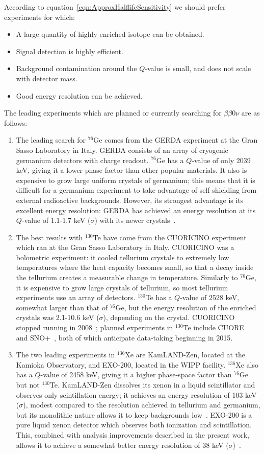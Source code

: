 According to equation~\ref{eqn:ApproxHalflifeSensitivity} we should prefer experiments for which:
\begin{itemize}
\item A large quantity of highly-enriched isotope can be obtained.
\item Signal detection is highly efficient.
\item Background contamination around the $Q$-value is small, and does not scale with detector mass.
\item Good energy resolution can be achieved.
\end{itemize}

The leading experiments which are planned or currently searching for $\beta\beta 0\nu$ are as follows:
\begin{enumerate}
\item The leading search for $^{76}$Ge comes from the GERDA experiment at the Gran Sasso Laboratory in Italy.  GERDA consists of an array of cryogenic germanium detectors with charge readout.  $^{76}$Ge has a $Q$-value of only 2039 keV, giving it a lower phase factor than other popular materials.  It also is expensive to grow large uniform crystals of germanium; this means that it is difficult for a germanium experiment to take advantage of self-shielding from external radioactive backgrounds.  However, its strongest advantage is its excellent energy resolution: GERDA has achieved an energy resolution at its $Q$-value of 1.1-1.7 keV ($\sigma$) with its newer crystals~\cite{PhysRevLett.111.122503}.
\item The best results with $^{130}$Te have come from the CUORICINO experiment which ran at the Gran Sasso Laboratory in Italy.  CUORICINO was a bolometric experiment: it cooled tellurium crystals to extremely low temperatures where the heat capacity becomes small, so that a decay inside the tellurium creates a measurable change in temperature.  Similarly to $^{76}$Ge, it is expensive to grow large crystals of tellurium, so most tellurium experiments use an array of detectors.  $^{130}$Te has a $Q$-value of 2528 keV, somewhat larger than that of $^{76}$Ge, but the energy resolution of the enriched crystals was 2.1-10.6 keV ($\sigma$), depending on the crystal.  CUORICINO stopped running in 2008~\cite{Andreotti2011822}; planned experiments in $^{130}$Te include CUORE~\cite{1402.0922} and SNO+~\cite{1402.1170}, both of which anticipate data-taking beginning in 2015.
\item The two leading experiments in $^{136}$Xe are KamLAND-Zen, located at the Kamioka Observatory, and EXO-200, located in the WIPP facility.  $^{136}$Xe also has a $Q$-value of 2458 keV, giving it a higher phase-space factor than $^{76}$Ge but not $^{130}$Te.  KamLAND-Zen dissolves its xenon in a liquid scintillator and observes only scintillation energy; it achieves an energy resolution of 103 keV ($\sigma$), modest compared to the resolution achieved in tellurium and germanium, but its monolithic nature allows it to keep backgrounds low~\cite{PhysRevLett.110.062502}.  EXO-200 is a pure liquid xenon detector which observes both ionization and scintillation. This, combined with analysis improvements described in the present work, allows it to achieve a somewhat better energy resolution of 38 keV ($\sigma$)~\cite{NewEXObb0nPaper_2014}.

\end{enumerate}
